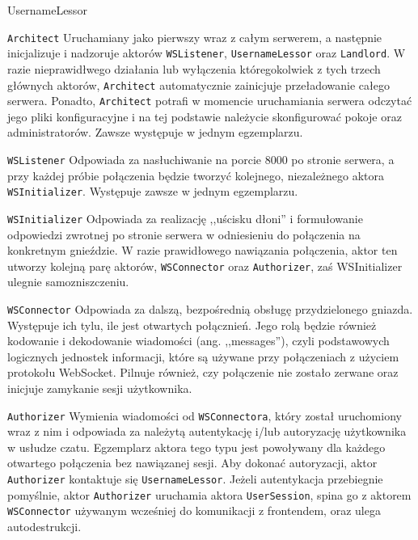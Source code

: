 \begin{labeling}{UsernameLessor}

  \item[\texttt{Architect}] Uruchamiany jako pierwszy wraz z całym
  serwerem, a następnie inicjalizuje i nadzoruje aktorów \texttt{WSListener},
  \texttt{UsernameLessor} oraz \texttt{Landlord}. W razie nieprawidłwego
  działania lub wyłączenia któregokolwiek z tych trzech głównych aktorów,
  \texttt{Architect} automatycznie zainicjuje przeładowanie całego serwera.
  Ponadto, \texttt{Architect} potrafi w momencie uruchamiania serwera odczytać
  jego pliki konfiguracyjne i na tej podstawie należycie skonfigurować pokoje
  oraz administratorów. Zawsze występuje w jednym egzemplarzu.

  \item[\texttt{WSListener}] Odpowiada za nasłuchiwanie na porcie 8000 po
  stronie serwera, a przy każdej próbie połączenia będzie tworzyć kolejnego,
  niezależnego aktora \texttt{WSInitializer}. Występuje zawsze w jednym
  egzemplarzu.

  \item[\texttt{WSInitializer}] Odpowiada za  realizację ,,uścisku dłoni'' i
  formułowanie odpowiedzi zwrotnej po stronie serwera w odniesieniu do
  połączenia na konkretnym gnieździe. W razie prawidłowego nawiązania
  połączenia, aktor ten utworzy kolejną parę aktorów, \texttt{WSConnector} oraz
  \texttt{Authorizer}, zaś WSInitializer ulegnie samozniszczeniu.

  \item[\texttt{WSConnector}] Odpowiada za dalszą, bezpośrednią obsługę
  przydzielonego gniazda. Występuje ich tylu, ile jest otwartych połącznień.
  Jego rolą będzie również kodowanie i dekodowanie wiadomości (ang.
  ,,messages''), czyli podstawowych logicznych jednostek informacji, które są
  używane przy połączeniach z użyciem protokołu WebSocket. Pilnuje również, czy
  połączenie nie zostało zerwane oraz inicjuje zamykanie sesji użytkownika.

  \item[\texttt{Authorizer}] Wymienia wiadomości od \texttt{WSConnectora}, który
  został uruchomiony wraz z nim i odpowiada za należytą autentykację i/lub
  autoryzację użytkownika w usłudze czatu. Egzemplarz aktora tego typu jest
  powoływany dla każdego otwartego połączenia bez nawiązanej sesji. Aby dokonać
  autoryzacji, aktor \texttt{Authorizer} kontaktuje się \texttt{UsernameLessor}.
  Jeżeli autentykacja przebiegnie pomyślnie, aktor \texttt{Authorizer} uruchamia
  aktora \texttt{UserSession}, spina go z aktorem \texttt{WSConnector} używanym
  wcześniej do komunikacji z frontendem, oraz ulega autodestrukcji.


\end{labeling}

